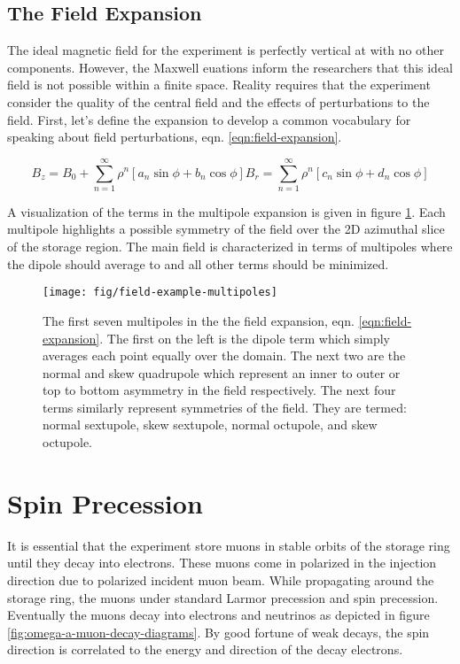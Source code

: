 \subsection{The Field Expansion}

The ideal magnetic field for the experiment is perfectly vertical at \bmagic with no other components.  However, the Maxwell euations inform the researchers that this ideal field is not possible within a finite space.  Reality requires that the experiment consider the quality of the central field and the effects of perturbations to the field.  First, let's define the expansion to develop a common vocabulary for speaking about field perturbations, eqn. \ref{eqn:field-expansion}.

\begin{equation}
B_z = B_0 + \sum_{n=1}^{\infty} \rho^n[a_n \sin{\phi} + b_n \cos{\phi}]
B_r = \sum_{n=1}^{\infty} \rho^n[c_n \sin{\phi} + d_n \cos{\phi}]
\label{eqn:field-expansion}
\end{equation}

\noindent
A visualization of the terms in the multipole expansion is given in figure \ref{fig:field-example-multipoles}.  Each multipole highlights a possible symmetry of the field over the 2D azimuthal slice of the storage region. The main field is characterized in terms of multipoles where the dipole should average to \bmagic and all other terms should be minimized.

\begin{figure}
\label{fig:field-example-multipoles}
\texttt{[image: fig/field-example-multipoles]}
\caption{The first seven multipoles in the the field expansion, eqn. \ref{eqn:field-expansion}.  The first on the left is the dipole term which simply averages each point equally over the domain.  The next two are the normal and skew quadrupole which represent an inner to outer or top to bottom asymmetry in the field respectively.  The next four terms similarly represent symmetries of the field.  They are termed: normal sextupole, skew sextupole, normal octupole, and skew octupole.}
\end{figure}

\section{Spin Precession}

It is essential that the experiment store muons in stable orbits of the storage ring until they decay into electrons.  These muons come in polarized in the injection direction due to polarized incident muon beam.  While propagating around the storage ring, the muons under standard Larmor precession and spin precession.  Eventually the muons decay into electrons and neutrinos as depicted in figure \ref{fig:omega-a-muon-decay-diagrams}.  By good fortune of weak decays, the spin direction is correlated to the energy and direction of the decay electrons.

